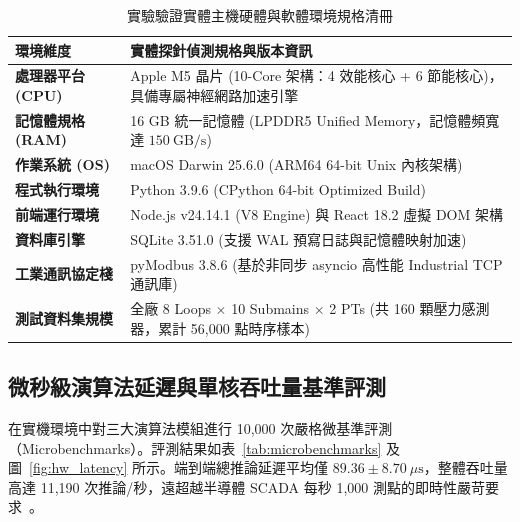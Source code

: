 \documentclass[fontset=none, a4paper, 12pt]{ctexart}
\begin{document}
\begin{doublespace}
\begin{table}[H]
\centering
\caption{實驗驗證實體主機硬體與軟體環境規格清冊}
\label{tab:hardware_env}
\footnotesize
\renewcommand{\arraystretch}{1.15}
\setlength{\tabcolsep}{6pt}
\begin{tabularx}{0.96\textwidth}{>{\bfseries}lX}
\toprule
環境維度 & 實體探針偵測規格與版本資訊 \\
\midrule
處理器平台 (CPU) & Apple M5 晶片 (10-Core 架構：4 效能核心 + 6 節能核心)，具備專屬神經網路加速引擎 \\
記憶體規格 (RAM) & 16 GB 統一記憶體 (LPDDR5 Unified Memory，記憶體頻寬達 $150\ \mathrm{GB/s}$) \\
作業系統 (OS) & macOS Darwin 25.6.0 (ARM64 64-bit Unix 內核架構) \\
程式執行環境 & Python 3.9.6 (CPython 64-bit Optimized Build) \\
前端運行環境 & Node.js v24.14.1 (V8 Engine) 與 React 18.2 虛擬 DOM 架構 \\
資料庫引擎 & SQLite 3.51.0 (支援 WAL 預寫日誌與記憶體映射加速) \\
工業通訊協定棧 & pyModbus 3.8.6 (基於非同步 asyncio 高性能 Industrial TCP 通訊庫) \\
測試資料集規模 & 全廠 8 Loops $\times$ 10 Submains $\times$ 2 PTs (共 160 顆壓力感測器，累計 56,000 點時序樣本) \\
\bottomrule
\end{tabularx}
\end{table}

\subsection{微秒級演算法延遲與單核吞吐量基準評測}
在實機環境中對三大演算法模組進行 10,000 次嚴格微基準評測（Microbenchmarks）。評測結果如表~\ref{tab:microbenchmarks} 及圖~\ref{fig:hw_latency} 所示。端到端總推論延遲平均僅 $89.36 \pm 8.70\ \mu\mathrm{s}$，整體吞吐量高達 11,190 次推論/秒，遠超越半導體 SCADA 每秒 1,000 測點的即時性嚴苛要求~\cite{wang2025microsecond}。


\end{doublespace}
\end{document}
